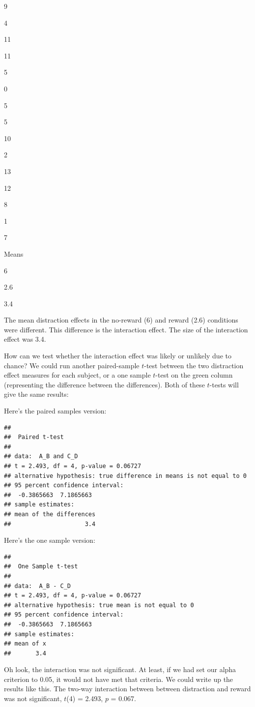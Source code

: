 \documentclass[
]{book}
\begin{document}
9

4

11

11

5

0

5

5

10

2

13

12

8

1

7

Means

6

2.6

3.4

The mean distraction effects in the no-reward (6) and reward (2.6) conditions were different. This difference is the interaction effect. The size of the interaction effect was 3.4.

How can we test whether the interaction effect was likely or unlikely due to chance? We could run another paired-sample \(t\)-test between the two distraction effect measures for each subject, or a one sample \(t\)-test on the green column (representing the difference between the differences). Both of these \(t\)-tests will give the same results:

Here's the paired samples version:

\begin{verbatim}
## 
## 	Paired t-test
## 
## data:  A_B and C_D
## t = 2.493, df = 4, p-value = 0.06727
## alternative hypothesis: true difference in means is not equal to 0
## 95 percent confidence interval:
##  -0.3865663  7.1865663
## sample estimates:
## mean of the differences 
##                     3.4
\end{verbatim}

Here's the one sample version:

\begin{verbatim}
## 
## 	One Sample t-test
## 
## data:  A_B - C_D
## t = 2.493, df = 4, p-value = 0.06727
## alternative hypothesis: true mean is not equal to 0
## 95 percent confidence interval:
##  -0.3865663  7.1865663
## sample estimates:
## mean of x 
##       3.4
\end{verbatim}

Oh look, the interaction was not significant. At least, if we had set our alpha criterion to 0.05, it would not have met that criteria. We could write up the results like this. The two-way interaction between between distraction and reward was not significant, \(t\)(4) = 2.493, \(p\) = 0.067.
\end{document}
